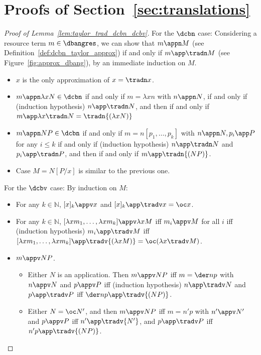\section{Proofs of Section~\ref{sec:translations}}
\label{appendix:translation}


\begin{proof}[Proof of Lemma~\ref{lem:taylor_trad_dcbn_dcbv}]
	For the $\dcbn$ case:
	Considering a resource term $m\in\dbangres$, we can show that $m\appn M$ (see
	Definition~\ref{def:dcbn_taylor_approx}) if and only if $m\app \tradn
	M$ (see Figure~\ref{fig:approx_dbang}), by an immediate induction on $M$.
	\begin{itemize}
		\item $x$ is the only approximation of $x=\tradn x$.
		\item $m\appn\lambda xN \in \dcbn$ if and only if $m=\lambda xn$ with
			$n\appn N$, if and only if (induction hypothesis) $n\app \tradn N$,
			and then if and only if $m\app \lambda x\tradn N=\tradn{(\lambda xN)}$
		\item $m\appn NP\in\dcbn$ if and only if $m=n[p_1,\dots ,p_k]$ with
			$n\appn N, p_i\app P$ for any $i\leq k$ if and only if
			(induction hypothesis) $n\app \tradn N$ and
			$p_i\app\tradn P$, and then if and only if $m\app
			\tradn{(NP)}$.
		\item Case $M= N[P/x]$ is similar to the previous one. \qedhere
	\end{itemize}

	For the $\dcbv$ case:
		By induction on $M$:
	\begin{itemize}
		\item For any $k\in\mathbb N$, $[x]_k\appv x$ and $[x]_k\app
			\tradv x = \oc x$.
		\item For any $k\in\mathbb N$, $[\lambda xm_1,\dots ,\lambda xm_k]
			\appv \lambda xM$ iff $m_i\appv M$ for all $i$ iff
			(induction hypothesis) $m_i\app \tradv M$ iff $[\lambda
			xm_1,\dots ,\lambda xm_k]\app\tradv{(\lambda xM)}=\oc(\lambda
			x\tradv M)$.
		\item $m\appv NP$.
			\begin{itemize}
				\item Either $N$ is an application. Then
					$m\appv NP$ iff $m=\der np$ with $n\appv N$ and $p\appv
					P$ iff (induction hypothesis) $n\app \tradv N$ and
					$p\app\tradv P$ iff $\der np\app\tradv{(NP)}$.
				\item Either $N=\oc N'$, and then $m\appv NP$
					iff $m= n'p$ with $n'\appv N'$ and
					$p\appv P$ iff $n'\app\tradv{N'}$, and
					$p\app\tradv P$ iff
					$n'p\app\tradv{(NP)}$. \qedhere
			\end{itemize}
	\end{itemize}
\end{proof}


